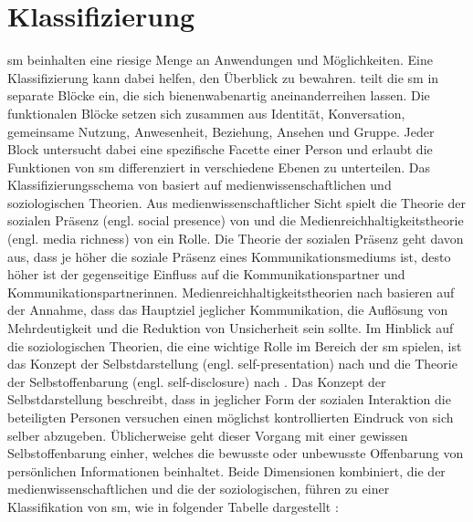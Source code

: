 \section{Klassifizierung}\label{sec.klassifiezierung}
\gls{sm} beinhalten eine riesige Menge an Anwendungen und Möglichkeiten. Eine Klassifizierung kann dabei helfen, den Überblick zu bewahren.  teilt die \gls{sm} in separate Blöcke ein, die sich bienenwabenartig aneinanderreihen lassen. Die funktionalen Blöcke setzen sich zusammen aus Identität, Konversation, gemeinsame Nutzung, Anwesenheit, Beziehung, Ansehen und Gruppe. Jeder Block untersucht dabei eine spezifische Facette einer Person und erlaubt die Funktionen von \gls{sm} differenziert in verschiedene Ebenen zu unterteilen.\newline
Das Klassifizierungsschema von  basiert auf medienwissenschaftlichen und soziologischen Theorien. Aus medienwissenschaftlicher Sicht spielt die Theorie der sozialen Präsenz (engl. social presence) von  und die Medienreichhaltigkeitstheorie (engl. media richness) von  ein Rolle. Die Theorie der sozialen Präsenz geht davon aus, dass je höher die soziale Präsenz eines Kommunikationsmediums ist, desto höher ist der gegenseitige Einfluss auf die Kommunikationspartner und Kommunikationspartnerinnen. Medienreichhaltigkeitstheorien nach  basieren auf der Annahme, dass das Hauptziel jeglicher Kommunikation, die Auflösung von Mehrdeutigkeit und die Reduktion von Unsicherheit sein sollte. Im Hinblick auf die soziologischen Theorien, die eine wichtige Rolle im Bereich der \gls{sm} spielen, ist das Konzept der Selbstdarstellung (engl. self-presentation) nach  und die Theorie der Selbstoffenbarung (engl. self-disclosure) nach . Das Konzept der Selbstdarstellung beschreibt, dass in jeglicher Form der sozialen Interaktion die beteiligten Personen versuchen einen möglichst kontrollierten Eindruck von sich selber abzugeben. Üblicherweise geht dieser Vorgang mit einer gewissen Selbstoffenbarung einher, welches die bewusste oder unbewusste Offenbarung von persönlichen Informationen beinhaltet. Beide Dimensionen kombiniert, die der medienwissenschaftlichen und die der soziologischen,  führen zu einer Klassifikation von \gls{sm}, wie in folgender Tabelle dargestellt \cite{Kaplan:2010}:	
